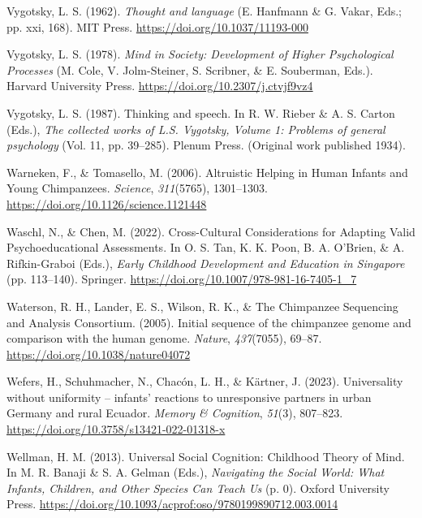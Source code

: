 \documentclass[
]{scrbook}
\newlength{\cslhangindent}
\newenvironment{CSLReferences}[2] %
 {\begin{list}{}{%
  \setlength{\itemindent}{0pt}
  \setlength{\leftmargin}{0pt}
  \setlength{\parsep}{0pt}
  \ifodd #1
   \setlength{\leftmargin}{\cslhangindent}
   \setlength{\itemindent}{-1\cslhangindent}
  \fi
  \setlength{\itemsep}{#2\baselineskip}}}
 {\end{list}}
\begin{document}
\begin{CSLReferences}{1}{0}
Vygotsky, L. S. (1962). \emph{Thought and language} (E. Hanfmann \& G. Vakar, Eds.; pp. xxi, 168). MIT Press. \url{https://doi.org/10.1037/11193-000}

Vygotsky, L. S. (1978). \emph{Mind in {Society}: {Development} of {Higher Psychological Processes}} (M. Cole, V. Jolm-Steiner, S. Scribner, \& E. Souberman, Eds.). Harvard University Press. \url{https://doi.org/10.2307/j.ctvjf9vz4}

Vygotsky, L. S. (1987). Thinking and speech. In R. W. Rieber \& A. S. Carton (Eds.), \emph{The collected works of {L}.{S}. {Vygotsky}, {Volume} 1: {Problems} of general psychology} (Vol. 11, pp. 39--285). Plenum Press. (Original work published 1934).

Warneken, F., \& Tomasello, M. (2006). Altruistic {Helping} in {Human Infants} and {Young Chimpanzees}. \emph{Science}, \emph{311}(5765), 1301--1303. \url{https://doi.org/10.1126/science.1121448}

Waschl, N., \& Chen, M. (2022). Cross-{Cultural Considerations} for {Adapting Valid Psychoeducational Assessments}. In O. S. Tan, K. K. Poon, B. A. O'Brien, \& A. Rifkin-Graboi (Eds.), \emph{Early {Childhood Development} and {Education} in {Singapore}} (pp. 113--140). Springer. \url{https://doi.org/10.1007/978-981-16-7405-1_7}

Waterson, R. H., Lander, E. S., Wilson, R. K., \& The Chimpanzee Sequencing and Analysis Consortium. (2005). Initial sequence of the chimpanzee genome and comparison with the human genome. \emph{Nature}, \emph{437}(7055), 69--87. \url{https://doi.org/10.1038/nature04072}

Wefers, H., Schuhmacher, N., Chacón, L. H., \& Kärtner, J. (2023). Universality without uniformity -- infants' reactions to unresponsive partners in urban {Germany} and rural {Ecuador}. \emph{Memory \& Cognition}, \emph{51}(3), 807--823. \url{https://doi.org/10.3758/s13421-022-01318-x}

Wellman, H. M. (2013). Universal {Social Cognition}: {Childhood Theory} of {Mind}. In M. R. Banaji \& S. A. Gelman (Eds.), \emph{Navigating the {Social World}: {What Infants}, {Children}, and {Other Species Can Teach Us}} (p. 0). Oxford University Press. \url{https://doi.org/10.1093/acprof:oso/9780199890712.003.0014}


\end{CSLReferences}
\end{document}
